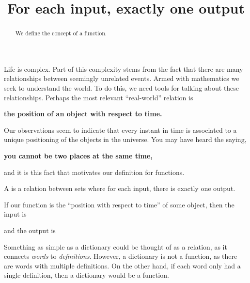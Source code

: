 \documentclass{ximera}
\title{For each input, exactly one output}
\begin{document}
\begin{abstract}
  We define the concept of a function.
\end{abstract}
\maketitle


Life is complex. Part of this complexity stems from the fact that
there are many relationships between seemingly unrelated events. Armed
with mathematics we seek to understand the world. To do this, we need
tools for talking about these relationships. Perhaps the most relevant
``real-world'' relation is
\begin{center}
  \textbf{the position of an object with respect to time.}
\end{center}
Our observations seem to indicate that every instant in time is
associated to a unique positioning of the objects in the universe.  You
may have heard the saying,
\begin{center}
  \textbf{you cannot be two places at the same time,}
\end{center}
and it is this fact that motivates our definition for functions.

\begin{definition}
A  is a relation between sets where for each input,
there is exactly one output.
\end{definition}

\begin{question}
  If our function is the ``position with respect to time'' of some
  object, then the input is
  \begin{multipleChoice}
  \end{multipleChoice}
  and the output is
  \begin{multipleChoice}
  \end{multipleChoice}
\end{question}


Something as simple as a dictionary could be thought of as a relation,
as it connects \textit{words} to \textit{definitions}. However, a
dictionary is not a function, as there are words with multiple
definitions. On the other hand, if each word only had a single
definition, then a dictionary would be a function.
\end{document}
